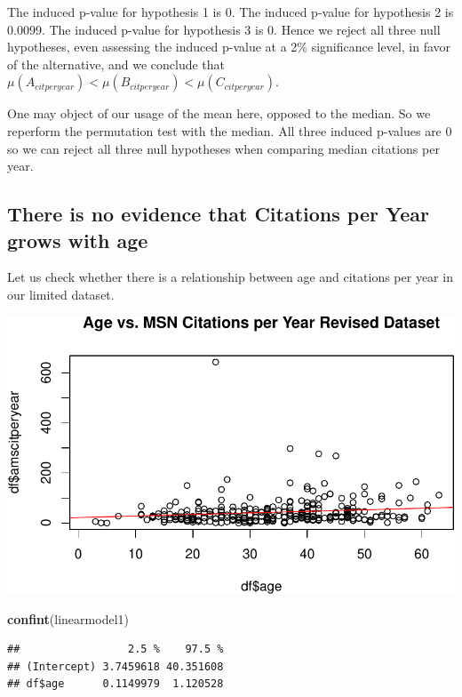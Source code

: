\documentclass[]{article}
\newenvironment{Shaded}{\begin{snugshade}}{\end{snugshade}}
\newcommand{\KeywordTok}[1]{\textcolor[rgb]{0.13,0.29,0.53}{\textbf{#1}}}
\newcommand{\NormalTok}[1]{#1}
\begin{document}
The induced p-value for hypothesis 1 is 0. The induced p-value for
hypothesis 2 is 0.0099. The induced p-value for hypothesis 3 is 0. Hence
we reject all three null hypotheses, even assessing the induced p-value
at a 2\% significance level, in favor of the alternative, and we
conclude that
\(\mu(A_{citperyear}) < \mu(B_{citperyear}) < \mu(C_{citperyear})\).

One may object of our usage of the mean here, opposed to the median. So
we reperform the permutation test with the median. All three induced
p-values are 0 so we can reject all three null hypotheses when comparing
median citations per year.

\hypertarget{there-is-no-evidence-that-citations-per-year-grows-with-age}{%
\subsection{There is no evidence that Citations per Year grows with
age}\label{there-is-no-evidence-that-citations-per-year-grows-with-age}}

Let us check whether there is a relationship between age and citations
per year in our limited dataset.

\includegraphics{index_files/figure-latex/unnamed-chunk-22-1.pdf}

\begin{Shaded}
\begin{Highlighting}[]
\KeywordTok{confint}\NormalTok{(linearmodel1)}
\end{Highlighting}
\end{Shaded}

\begin{verbatim}
##                 2.5 %    97.5 %
## (Intercept) 3.7459618 40.351608
## df$age      0.1149979  1.120528
\end{verbatim}
\end{document}
